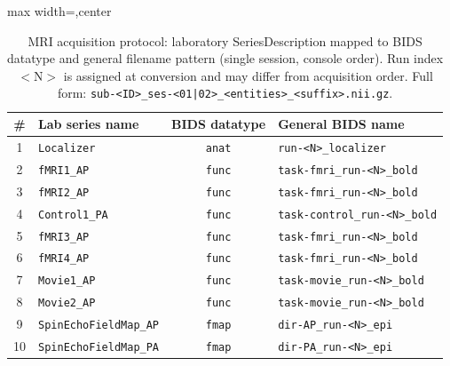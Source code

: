 \begin{table}[htbp]
\centering
\caption{MRI acquisition protocol: laboratory SeriesDescription mapped to BIDS datatype and general filename pattern (single session, console order). Run index $<$N$>$ is assigned at conversion and may differ from acquisition order. Full form: \texttt{sub-<ID>\_ses-<01|02>\_<entities>\_<suffix>.nii.gz}.}
\label{tab:mri_acquisition}
\footnotesize
\setlength{\tabcolsep}{4pt}
\renewcommand{\arraystretch}{1.22}
\begin{adjustbox}{max width=\textwidth,center}
\begin{tabular}{@{}c l c l@{}}
\toprule
\textcolor{headergray}{\textbf{\#}} &
\textcolor{headergray}{\textbf{Lab series name}} &
\textcolor{headergray}{\textbf{BIDS datatype}} &
\textcolor{headergray}{\textbf{General BIDS name}} \\
\midrule
1 & \texttt{Localizer} & \texttt{anat} & \texttt{run-\textless{}N\textgreater{}\_localizer} \\
\rowcolor{tablealt}
2 & \texttt{fMRI1\_AP} & \texttt{func} & \texttt{task-fmri\_run-\textless{}N\textgreater{}\_bold} \\
3 & \texttt{fMRI2\_AP} & \texttt{func} & \texttt{task-fmri\_run-\textless{}N\textgreater{}\_bold} \\
\rowcolor{tablealt}
4 & \texttt{Control1\_PA} & \texttt{func} & \texttt{task-control\_run-\textless{}N\textgreater{}\_bold} \\
5 & \texttt{fMRI3\_AP} & \texttt{func} & \texttt{task-fmri\_run-\textless{}N\textgreater{}\_bold} \\
\rowcolor{tablealt}
6 & \texttt{fMRI4\_AP} & \texttt{func} & \texttt{task-fmri\_run-\textless{}N\textgreater{}\_bold} \\
7 & \texttt{Movie1\_AP} & \texttt{func} & \texttt{task-movie\_run-\textless{}N\textgreater{}\_bold} \\
\rowcolor{tablealt}
8 & \texttt{Movie2\_AP} & \texttt{func} & \texttt{task-movie\_run-\textless{}N\textgreater{}\_bold} \\
9 & \texttt{SpinEchoFieldMap\_AP} & \texttt{fmap} & \texttt{dir-AP\_run-\textless{}N\textgreater{}\_epi} \\
\rowcolor{tablealt}
10 & \texttt{SpinEchoFieldMap\_PA} & \texttt{fmap} & \texttt{dir-PA\_run-\textless{}N\textgreater{}\_epi} \\

\end{tabular}
\end{adjustbox}
\end{table}
